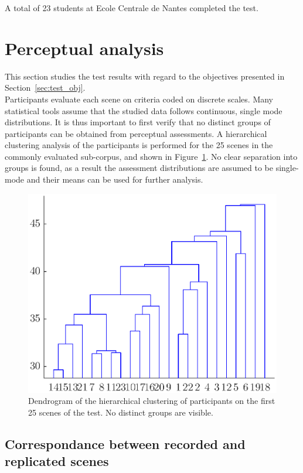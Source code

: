 \documentclass[11pt,a4paper]{article}
\begin{document}
A total of 23 students at Ecole Centrale de Nantes completed the test.
		
\section{Perceptual analysis}

This section studies the test results with regard to the objectives presented in Section~\ref{sec:test_obj}.\\

Participants evaluate each scene on criteria coded on discrete scales. Many statistical tools assume that the studied data follows continuous, single mode distributions. It is thus important to first verify that no distinct groups of participants can be obtained from perceptual assessments. A hierarchical clustering analysis of the participants is performed for the 25 scenes in the commonly evaluated sub-corpus, and shown in Figure~\ref{fig:hclusters}. No clear separation into groups is found, as a result the assessment distributions are assumed to be single-mode and their means can be used for further analysis.

\begin{figure}[!h]
    \centering
    \includegraphics[width=\textwidth]{figures/subj_gr.eps}
    \caption{Dendrogram of the hierarchical clustering of participants on the first 25 scenes of the test. No distinct groups are visible.}\label{fig:hclusters}
\end{figure}

\subsection{Correspondance between recorded and replicated scenes}
\end{document}
